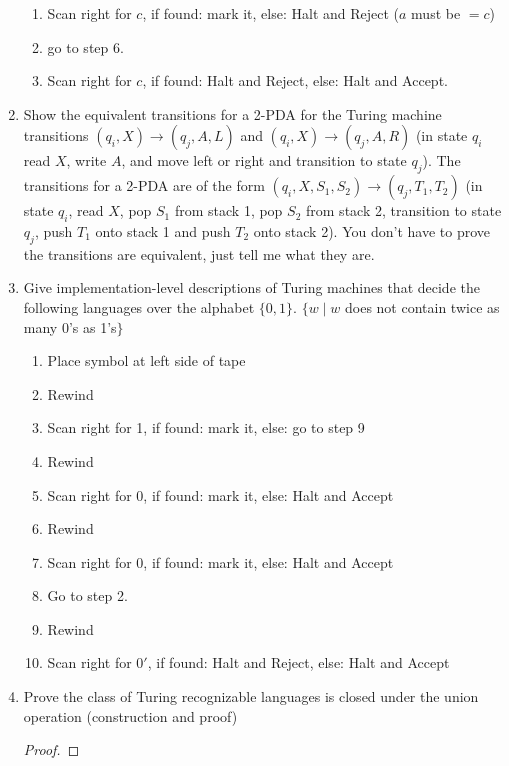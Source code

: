 \documentclass{article}
\begin{document}
\begin{enumerate}
\begin{enumerate}[label = (\arabic*)]
            \item Scan right for $c$, if found: mark it, else: Halt and Reject ($a$ must be $= c$)
            \item go to step 6.
            \item Scan right for $c$, if found: Halt and Reject, else: Halt and Accept.
        \end{enumerate}
        \item Show the equivalent transitions for a 2-PDA for the 
        Turing machine transitions $(q_i, X) \rightarrow (q_j, A, L)$ and $(q_i, X) \rightarrow 
        (q_j, A, R)$ (in state $q_i$ read $X$, write $A$, and move left or right and transition to 
        state $q_j$). The transitions for a 2-PDA are of the form $(q_i, X, S_1, S_2) \rightarrow
        (q_j, T_1, T_2)$ (in state $q_i$, read $X$, pop $S_1$ from stack 1, pop $S_2$ from stack 2, 
        transition to state $q_j$, push $T_1$ onto stack 1 and push $T_2$ onto stack 2). You don't 
        have to prove the transitions are equivalent, just tell me what they are.
        \item Give implementation-level descriptions of Turing machines that decide the following 
        languages over the alphabet $\{0,1\}$. $\{w\mid w $ does not contain twice as many 0's as 
        1's$\}$
        \begin{enumerate}[label=(\arabic*)]
            \item Place symbol at left side of tape
            \item Rewind            
            \item Scan right for 1, if found: mark it, else: go to step 9
            \item Rewind
            \item Scan right for 0, if found: mark it, else: Halt and Accept
            \item Rewind
            \item Scan right for 0, if found: mark it, else: Halt and Accept
            \item Go to step 2.
            \item Rewind
            \item Scan right for $0'$, if found: Halt and Reject, else: Halt and Accept
        \end{enumerate}
        \item Prove the class of Turing recognizable languages is closed under the union operation 
        (construction and proof)
        \begin{proof}

\end{proof}
\end{enumerate}
\end{document}
